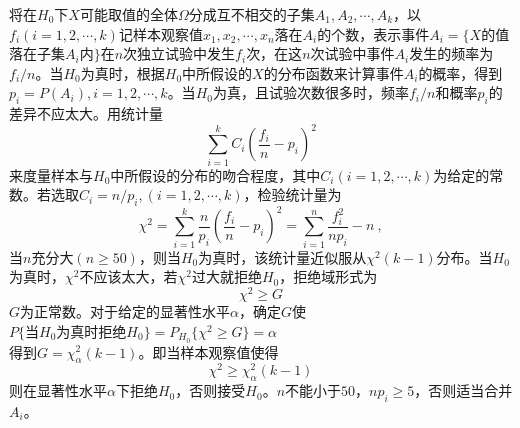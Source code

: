 \documentclass[12pt,a4paper]{article}
\begin{document}
将在$H_0$下$X$可能取值的全体$\Omega$分成互不相交的子集$A_1, A_2, \cdots, A_k$，以$f_i (i =1, 2, \cdots, k)$记样本观察值$x_1, x_2, \cdots, x_n$落在$A_i$的个数，表示事件$A_i =\{X$的值落在子集$A_i$内$\}$在$n$次独立试验中发生$f_i$次，在这$n$次试验中事件$A_i$发生的频率为$f_i/n$。当$H_0$为真时，根据$H_0$中所假设的$X$的分布函数来计算事件$A_i$的概率，得到$p_i = P(A_i), i = 1, 2, \cdots, k$。当$H_0$为真，且试验次数很多时，频率$f_i/n$和概率$p_i$的差异不应太大。用统计量
\begin{equation}
\sum_{i=1}^k C_i \left(\frac{f_i}{n} -p_i\right)^2
\end{equation}
来度量样本与$H_0$中所假设的分布的吻合程度，其中$C_i (i = 1, 2, \cdots, k)$为给定的常数。若选取$C_i = n/p_i, (i = 1, 2, \cdots, k)$，检验统计量为
\begin{equation}
\chi^2 = \sum_{i=1}^k \frac{n}{p_i} \left(\frac{f_i}{n} -p_i\right)^2 = \sum_{i=1}^n \frac{f_i^2}{np_i} -n ~,
\end{equation}
当$n$充分大$(n \geqslant 50)$，则当$H_0$为真时，该统计量近似服从$\chi^2 (k-1)$分布。当$H_0$为真时，$\chi^2$不应该太大，若$\chi^2$过大就拒绝$H_0$，拒绝域形式为
\begin{equation}
\chi^2 \geqslant G
\end{equation}
$G$为正常数。对于给定的显著性水平$\alpha$，确定$G$使 \\
$P\{$当$H_0$为真时拒绝$H_0\} = P_{H_0} \{ \chi^2 \geqslant G\} = \alpha$ \\
得到$G = \chi^2_{\alpha}(k-1)$。即当样本观察值使得
\begin{equation}
\chi^2 \geqslant \chi^2_{\alpha}(k-1)
\end{equation}
则在显著性水平$\alpha$下拒绝$H_0$，否则接受$H_0$。$n$不能小于$50$，$np_i \geqslant 5$，否则适当合并$A_i$。
\end{document}
